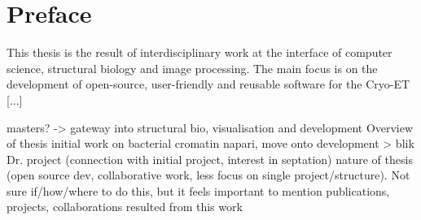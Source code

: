 \chapter{Preface}

This thesis is the result of interdisciplinary work at the interface of computer science, structural biology and image processing. The main focus is on the development of open-source, user-friendly and reusable software for the Cryo-ET [...]

\begin{outline}
\1 masters? -> gateway into structural bio, visualisation and development
\1 Overview of thesis
    \2 initial work on bacterial cromatin
    \2 napari, move onto development > blik
    \2 Dr. project (connection with initial project, interest in septation)
\1 nature of thesis (open source dev, collaborative work, less focus on single project/structure). Not sure if/how/where to do this, but it feels important to mention
\1 publications, projects, collaborations resulted from this work
\end{outline}

